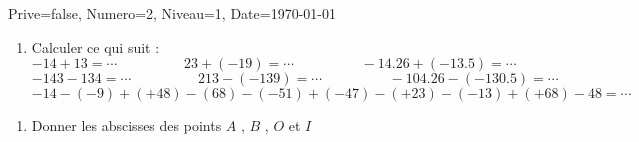 \documentclass[a4paper,12pt]{article}
\begin{document}
\begin{Maquette}[DM]{Prive=false, Numero=2, Niveau=1, Date=\today}
\begin{exercice}
\begin{enumerate}
\item Calculer ce qui suit : 
\[-14+13=\cdots \hspace{2cm}
	23+(-19)=\cdots \hspace{2cm}
	-14.26+(-13.5)=\cdots
\]
\[-143-134=\cdots \hspace{2cm}
	213-(-139)=\cdots \hspace{2cm}
	-104.26-(-130.5)=\cdots
\]
\[-14-(-9)+(+48)-(68)-(-51)+(-47)-(+23)-(-13)+(+68)-48=\cdots
\]
\end{enumerate}

\end{exercice}

\begin{exercice}
\begin{enumerate}
\item Donner les abscisses des points $A$ , $B$ , $O$ et $I$ 
\end{enumerate}

\end{exercice}

\end{Maquette}
\end{document}
